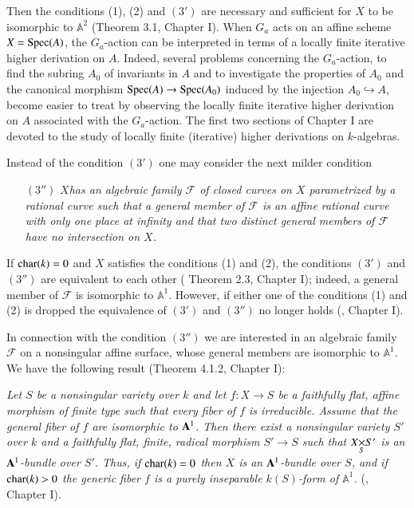 Then the conditions (1), (2) and $(3')$ are necessary and sufficient
for $X$ to be isomorphic to $\mathbb{A}^{2}$ (\cf Theorem 3.1, Chapter
I). When $G_{a}$ acts on an affine scheme $X=\operatorname{Spec}(A)$, the
$G_{a}$-action can be interpreted in terms of a locally finite
iterative higher derivation on $A$. Indeed, several problems
concerning the $G_{a}$-action, \eg to find the subring $A_{0}$ of
invariants in $A$ and to investigate the properties of $A_{0}$ and the
canonical morphism $\operatorname{Spec} (A)\to \operatorname{Spec}(A_{0})$ induced by the
injection $A_{0}\hookrightarrow A$, become easier to treat by
observing the locally finite iterative higher derivation on $A$
associated with the $G_{a}$-action. The first two sections of Chapter
I are devoted to the study of locally finite (iterative) higher
derivations on $k$-algebras.

Instead of the condition $(3')$ one may consider the next milder condition
\begin{itemize}
\item[$(3'')$] {\em $X$\pageoriginale has an algebraic family
  $\mathscr{F}$ of closed curves on $X$ parametrized by a rational
  curve such that a general member of $\mathscr{F}$ is an affine
  rational curve with only one place at infinity and that two distinct
general members of $\mathscr{F}$ have no intersection on $X$.}
\end{itemize}

If $\operatorname{char}(k)=0$ and $X$ satisfies the conditions (1) and (2), the
conditions $(3')$ and $(3'')$ are equivalent to each other (\cf
Theorem 2.3, Chapter I); indeed, a general member of $\mathscr{F}$ is
isomorphic to $\mathbb{A}^{1}$. However, if either one of the
conditions (1) and (2) is dropped the equivalence of $(3')$ and
$(3'')$ no longer holds (, Chapter I).

In connection with the condition $(3'')$ we are interested in an
algebraic family $\mathscr{F}$ on a nonsingular affine surface, whose
general members are isomorphic to $\mathbb{A}^{1}$. We have the
following result (\cf Theorem 4.1.2, Chapter I):

{\em Let $S$ be a nonsingular variety over $k$ and let $f:X\to S$ be a
  faithfully flat, affine morphism of finite type such that every
  fiber of $f$ is irreducible. Assume that the general fiber of $f$
  are isomorphic to $\mathbf{A}^{1}$. Then there exist a nonsingular
  variety $S'$ over $k$ and a faithfully flat, finite, radical
  morphism $S'\to S$ such that $\fprod{X}{S'}{S}$ is an
  $\mathbf{A}^{1}$-bundle over $S'$. Thus, if $\operatorname{char}(k)=0$ then $X$ is an
  $\mathbf{A}^{1}$-bundle over $S$, and if $\operatorname{char}(k)>0$ the generic fiber $f$
  is a purely inseparable $k(S)$-form of $\mathbb{A}^{1}$.} (,
Chapter I).

